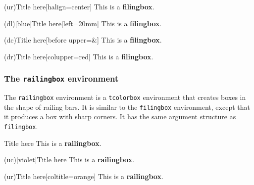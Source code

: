 \documentclass{article}
\begin{document}
{\begin{verbbox}
\begin{filingbox}(ur){Title here}[halign=center]
This is a \textbf{filingbox}.
\end{filingbox}
\end{verbbox}

\begin{verbbox}
\begin{filingbox}(dl)[blue]{Title here}[left=20mm]
This is a \textbf{filingbox}.
\end{filingbox}
\end{verbbox}

\begin{verbbox}
\begin{filingbox}(dc){Title here}[before upper=\&]
This is a \textbf{filingbox}.
\end{filingbox}
\end{verbbox}

\begin{verbbox}
\begin{filingbox}(dr){Title here}[colupper=red]
This is a \textbf{filingbox}.
\end{filingbox}
\end{verbbox}

\subsubsection*{The \texttt{railingbox} environment}

The \texttt{railingbox} environment is a \texttt{tcolorbox} environment that creates boxes in the shape of railing bars. It is similar to the \texttt{filingbox} environment, except that it produces a box with sharp corners. It has the same argument structure as \texttt{filingbox}.

\begin{verbbox}
\begin{railingbox}{Title here}
This is a \textbf{railingbox}.
\end{railingbox}
\end{verbbox}

\begin{verbbox}
\begin{railingbox}(uc)[violet]{Title here}
This is a \textbf{railingbox}.
\end{railingbox}
\end{verbbox}

\begin{verbbox}
\begin{railingbox}(ur){Title here}[coltitle=orange]
This is a \textbf{railingbox}.
\end{railingbox}
\end{verbbox}

}
\end{document}
